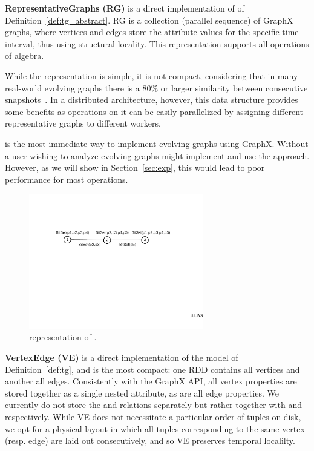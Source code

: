 {\bf RepresentativeGraphs (RG)} is a direct implementation of \trg of
Definition~\ref{def:tg_abstract}.  RG is a collection (parallel
sequence) of GraphX graphs, where vertices and edges store the
attribute values for the specific time interval, thus using structural
locality.  This representation supports all operations of \tg algebra.

While the \rg representation is simple, it is not compact, considering
that in many real-world evolving graphs there is a 80\% or larger
similarity between consecutive
snapshots~\cite{DBLP:journals/tos/MiaoHLWYZPCC15}.  In a distributed
architecture, however, this data structure provides some benefits as
operations on it can be easily parallelized by assigning different
representative graphs to different workers.

\rg is the most immediate way to implement evolving graphs using
GraphX. Without \ql a user wishing to analyze evolving graphs might
implement and use the \rg approach.  However, as we will show in
Section~\ref{sec:exp}, this would lead to poor performance for most
operations.

\begin{figure}[t!]
\includegraphics[width=3in]{figs/ogc.pdf}
\caption{\og representation of .}
\label{fig:ogc}
\end{figure}

{\bf VertexEdge (VE)} is a direct implementation of the \tve model of
Definition~\ref{def:tg}, and is the most compact: one RDD contains all
vertices and another all edges.  Consistently with the GraphX API, all
vertex properties are stored together as a single nested attribute, as
are all edge properties.  We currently do not store the \tv and \te
relations separately but rather together with \tav and \tae
respectively.  While VE does not necessitate a particular order of
tuples on disk, we opt for a physical layout in which all tuples
corresponding to the same vertex (resp. edge) are laid out
consecutively, and so VE preserves temporal localilty.

